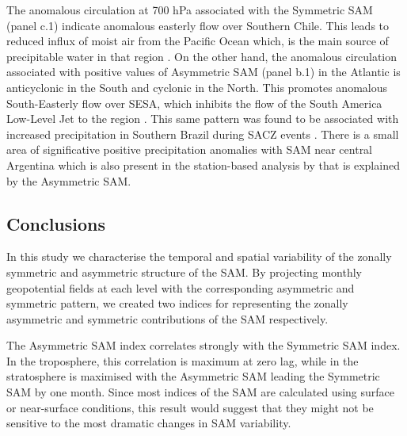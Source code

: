 \documentclass[smallextended]{svjour3}       %
\begin{document}
The anomalous circulation at 700 hPa associated with the Symmetric SAM (panel c.1) indicate anomalous easterly flow over Southern Chile. This leads to reduced influx of moist air from the Pacific Ocean which, is the main source of precipitable water in that region \citep[e.g.][]{garreaud2007}. On the other hand, the anomalous circulation associated with positive values of Asymmetric SAM (panel b.1) in the Atlantic is anticyclonic in the South and cyclonic in the North. This promotes anomalous South-Easterly flow over SESA, which inhibits the flow of the South America Low-Level Jet to the region \citep{silvestri2009, zamboni2010}. This same pattern was found to be associated with increased precipitation in Southern Brazil during SACZ events \citep{rosso2018}. There is a small area of significative positive precipitation anomalies with SAM near central Argentina which is also present in the station-based analysis by \citet{gillett2006} that is explained by the Asymmetric SAM.

\hypertarget{conclusions}{%
\subsection{Conclusions}\label{conclusions}}

In this study we characterise the temporal and spatial variability of the zonally symmetric and asymmetric structure of the SAM. By projecting monthly geopotential fields at each level with the corresponding asymmetric and symmetric pattern, we created two indices for representing the zonally asymmetric and symmetric contributions of the SAM respectively.

The Asymmetric SAM index correlates strongly with the Symmetric SAM index. In the troposphere, this correlation is maximum at zero lag, while in the stratosphere is maximised with the Asymmetric SAM leading the Symmetric SAM by one month. Since most indices of the SAM are calculated using surface or near-surface conditions, this result would suggest that they might not be sensitive to the most dramatic changes in SAM variability.
\end{document}
